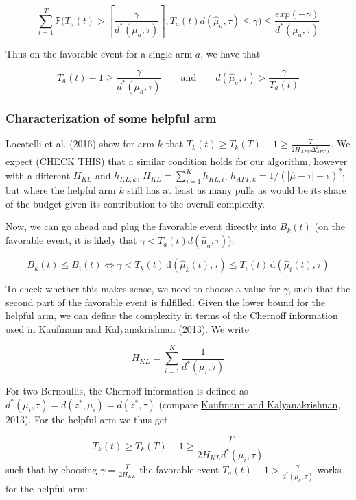 \documentclass[12pt,]{article}
\newcommand{\der}{\,\text{d}}
\begin{document}
\[
\sum_{t=1}^T \mathbb{P} \Big(T_a(t) > \left \lceil{\frac{\gamma}{d^*(\mu_a,\tau)}}\right \rceil, T_a(t) d(\hat{\mu}_a, \tau) \leq \gamma \Big) \leq \frac{exp(-\gamma)}{d^*(\mu_a, \tau)}
\]

Thus on the favorable event for a single arm \(a\), we have that

\[
T_a(t) -1 \geq \frac{\gamma}{d^*(\mu_a, \tau)} \qquad \text{and} \qquad d(\hat{\mu}_a, \tau) > \frac{\gamma}{T_a(t)}
\]

\subsubsection{Characterization of some helpful
arm}\label{characterization-of-some-helpful-arm}

Locatelli et al. (2016) show for arm \(k\) that
\(T_k(t) \geq T_k(T) - 1 \geq \frac{T}{2H_{APT}\Delta^2_{APT,k}}\). We
expect (CHECK THIS) that a similar condition holds for our algorithm,
however with a different \(H_{KL}\) and \(h_{KL,k}\),
\(H_{KL} = \sum_{i=1}^K h_{KL,i}\),
\(h_{APT,k} = 1/(|\hat{\mu}-\tau|+\epsilon)^2\); but where the helpful
arm \(k\) still has at least as many pulls as would be its share of the
budget given its contribution to the overall complexity.

Now, we can go ahead and plug the favorable event directly into
\(B_k(t)\) (on the favorable event, it is likely that
\(\gamma < T_a(t) d(\hat{\mu}_a, \tau)\)):

\[
B_k(t) \leq B_i(t) \Leftrightarrow \gamma < T_k(t) \der(\hat{\mu}_k(t), \tau) \leq T_i(t) \der(\hat{\mu}_i(t), \tau) 
\]

To check whether this makes sense, we need to choose a value for
\(\gamma\), such that the second part of the favorable event is
fulfilled. Given the lower bound for the helpful arm, we can define the
complexity in terms of the Chernoff information used in
\href{http://proceedings.mlr.press/v30/Kaufmann13.pdf}{Kaufmann and
Kalyanakrishnan} (2013). We write

\[
H_{KL} = \sum_{i=1}^K \frac{1}{d^*(\mu_i, \tau)}
\]

For two Bernoullis, the Chernoff information is defined as
\(d^*(\mu_i, \tau) = d(z^*,\mu_i) = d(z^*, \tau)\) (compare
\href{http://proceedings.mlr.press/v30/Kaufmann13.pdf}{Kaufmann and
Kalyanakrishnan}, 2013). For the helpful arm we thus get

\[
T_k(t) \geq T_k(T) -1 \geq \frac{T}{2 H_{KL} d^*(\mu_i, \tau)}
\] such that by choosing \(\gamma = \frac{T}{2H_{KL}}\) the favorable
event \(T_a(t) -1 > \frac{\gamma}{d^*(\mu_a, \tau)}\) works for the
helpful arm:
\end{document}
